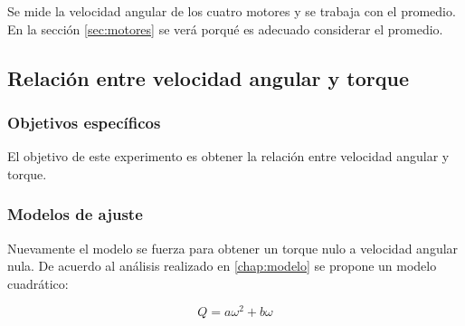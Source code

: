 \documentclass[main]{subfiles}
\begin{document}
Se mide la velocidad angular de los cuatro motores y se trabaja con el promedio. En la secci\'on \ref{sec:motores} se ver\'a porqu\'e es adecuado considerar el promedio.

\subsection{Relaci\'on entre velocidad angular y torque}

\subsubsection*{Objetivos espec\'ificos}
El objetivo de este experimento es obtener la relaci\'on entre velocidad angular y torque.

\subsubsection*{Modelos de ajuste}
Nuevamente el modelo se fuerza para obtener un torque nulo a velocidad angular nula. De acuerdo al an\'alisis realizado en \ref{chap:modelo} se propone un modelo cuadr\'atico:

$$Q=a\omega^2+b\omega$$
\end{document}

